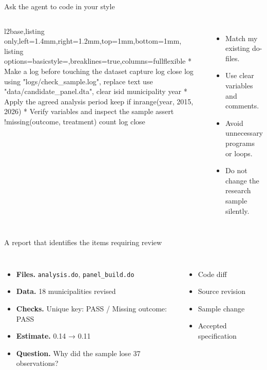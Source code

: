 \begin{frame}[fragile]{Ask the agent to code in your style}
\begin{columns}[T,onlytextwidth]
\begin{tcblisting}{l2base,listing only,left=1.4mm,right=1.2mm,top=1mm,bottom=1mm,
  listing options={basicstyle=\ttfamily\fontsize{6.2}{7.4}\selectfont,breaklines=true,columns=fullflexible}}
* Make a log before touching the dataset
capture log close
log using "logs/check_sample.log", replace text
use "data/candidate_panel.dta", clear
isid municipality year
* Apply the agreed analysis period
keep if inrange(year, 2015, 2026)
* Verify variables and inspect the sample
assert !missing(outcome, treatment)
count
log close
\end{tcblisting}
\begin{itemize}\setlength{\itemsep}{0.45em}
\item Match my existing do-files.
\item Use clear variables and comments.
\item Avoid unnecessary programs or loops.
\item Do not change the research sample silently.
\end{itemize}
\end{columns}
\end{frame}

\begin{frame}{A report that identifies the items requiring review}
\begin{columns}[T,onlytextwidth]
\begin{itemize}\setlength{\itemsep}{0.38em}
\item \textbf{Files.} \texttt{analysis.do}, \texttt{panel\_build.do}
\item \textbf{Data.} 18 municipalities revised
\item \textbf{Checks.} Unique key: PASS / Missing outcome: PASS
\item \textbf{Estimate.} 0.14 → 0.11
\item \textbf{Question.} Why did the sample lose 37 observations?
\end{itemize}
\begin{itemize}\setlength{\itemsep}{0.38em}
\item Code diff
\item Source revision
\item Sample change
\item Accepted specification
\end{itemize}
\end{columns}
\end{frame}

